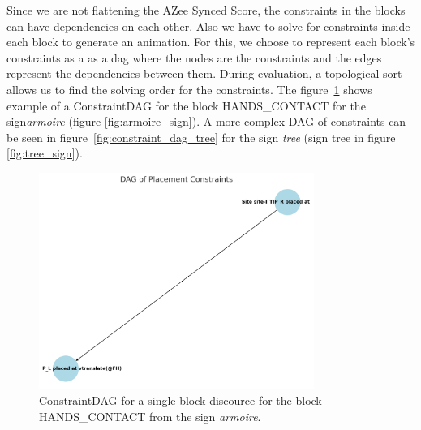 \documentclass[../../main.tex]{subfiles}
\begin{document}
Since we are not flattening the AZee Synced Score, the constraints in the blocks can have dependencies on each other. Also we have to solve for constraints inside each block to generate an animation. For this, we choose to represent each block's constraints as a as a \gls{dag} where the nodes are the constraints and the edges represent the dependencies between them. During evaluation, a topological sort allows us to find the solving order for the constraints. The figure~\ref{fig:constraint_dag_armoire} shows example of a ConstraintDAG for the block HANDS\_CONTACT for the sign\emph{armoire} (figure \ref{fig:armoire_sign}). A more complex DAG of constraints can be seen in figure~\ref{fig:constraint_dag_tree} for the sign \emph{tree} (sign tree in figure \ref{fig:tree_sign}).

\begin{figure}[h]
    \centering
    \includegraphics[width=0.8\textwidth]{chapters/multi_track/images/constraint_dag_cupboard.png}
    \caption{ConstraintDAG for a single block discource for the block HANDS\_CONTACT from the sign \emph{armoire}.}
    \label{fig:constraint_dag_armoire}
\end{figure}
\end{document}
